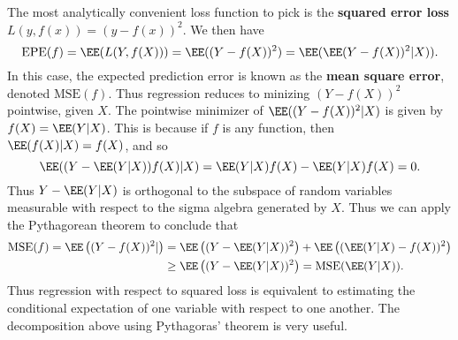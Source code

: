 \begin{example}
	The most analytically convenient loss function to pick is the {\bf squared error loss} $L(y,f(x)) = (y - f(x))^2$. We then have
	\[ \text{EPE}(f) = \EE(L(Y,f(X))) = \EE((Y - f(X))^2) = \EE(\EE(Y - f(X))^2 | X)). \]
	In this case, the expected prediction error is known as the {\bf mean square error}, denoted $\text{MSE}(f)$. Thus regression reduces to minizing $(Y - f(X))^2$ pointwise, given $X$. The pointwise minimizer of $\EE((Y - f(X))^2|X)$ is given by $f(X) = \EE(Y|X)$. This is because if $f$ is any function, then $\EE(f(X)|X) = f(X)$, and so
	\[ \EE((Y - \EE(Y|X))f(X)|X) = \EE(Y|X) f(X) - \EE(Y|X) f(X) = 0. \]
	Thus $Y - \EE(Y|X)$ is orthogonal to the subspace of random variables measurable with respect to the sigma algebra generated by $X$. Thus we can apply the Pythagorean theorem to conclude that
	\begin{align*}
		\text{MSE}(f) = \EE \left( (Y - f(X))^2 | \right) &= \EE \left((Y - \EE(Y|X))^2 \right) + \EE \left( (\EE(Y|X) - f(X))^2 \right)\\
		&\geq \EE \left( (Y - \EE(Y|X))^2 \right) = \text{MSE}(\EE(Y|X)).
	\end{align*}
	Thus regression with respect to squared loss is equivalent to estimating the conditional expectation of one variable with respect to one another. The decomposition above using Pythagoras' theorem is very useful.
\end{example}

